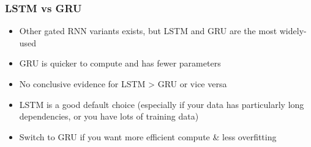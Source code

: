 \documentclass[11pt]{article}
\begin{document}
\begin{figure}[H]
    \centering
\end{figure}

\subsubsection{LSTM vs GRU}

\begin{itemize}
    \item Other gated RNN variants exists, but LSTM and GRU are the most widely-used
    \item GRU is quicker to compute and has fewer parameters
    \item No conclusive evidence for LSTM > GRU or vice versa
    \item LSTM is a good default choice (especially if your data has particularly long dependencies, or you have lots of training data)
    \item Switch to GRU if you want more efficient compute \& less overfitting
\end{itemize}
\end{document}
